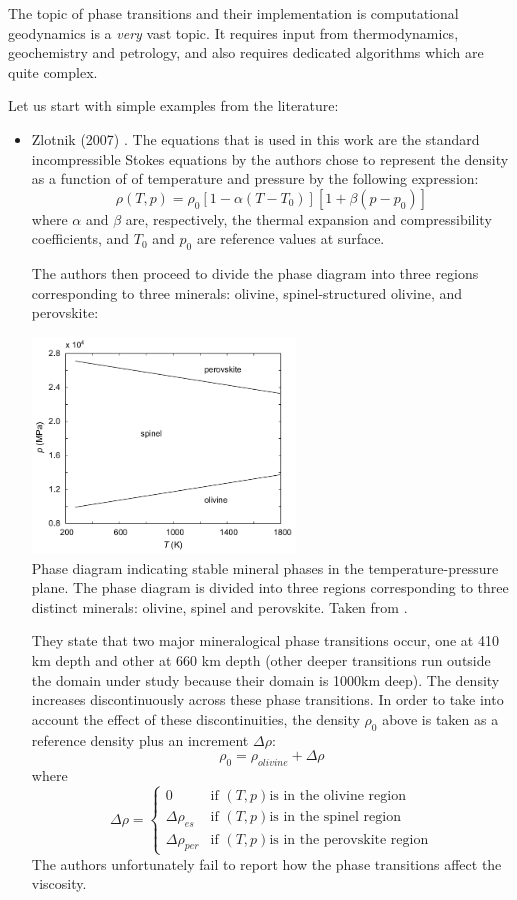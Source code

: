 
The topic of phase transitions and their implementation is computational geodynamics is a 
{\sl very} vast topic. It requires input from thermodynamics, geochemistry and petrology, and also requires 
dedicated algorithms which are quite complex.

Let us start with simple examples from the literature:

\begin{itemize}
\item Zlotnik \etal (2007) \cite{zldf07}. The equations that is used in this work are the 
standard incompressible Stokes equations by the authors chose to represent the 
density as a function of of temperature and pressure by the following expression:
\[
\rho(T,p)=\rho_0[1-\alpha(T-T_0)][1+\beta(p-p_0)]
\]
where $\alpha$ and $\beta$ are, respectively, the thermal expansion and
compressibility coefficients, and $T_0$ and $p_0$ are reference values at surface.

The authors then proceed to divide the phase diagram into three regions corresponding 
to three minerals: olivine, spinel-structured olivine, and perovskite:

\begin{center}
\includegraphics[width=7cm]{images/phasetransitions/zldf07}\\
{\captionfont Phase diagram indicating stable mineral phases in the 
temperature-pressure plane. The phase diagram is divided into three regions
corresponding to three distinct minerals: olivine, spinel and perovskite.
Taken from \cite{zldf07}.}
\end{center}

They state that two major mineralogical phase transitions occur, one at
410 km depth and other at 660 km depth (other deeper transitions run outside the 
domain under study because their domain is 1000km deep). The density increases 
discontinuously across these phase transitions. 
In order to take into account the effect of these 
discontinuities, the density $\rho_0$ above is taken as a reference density plus an 
increment $\Delta \rho$:
\[
\rho_0 = \rho_{olivine} + \Delta \rho
\]
where 
\[
\Delta \rho
=
\left\{
\begin{array}{lll}
0 & \text{if } (T,p) \text{is in the olivine region} \\
\Delta \rho_{es} & \text{if } (T,p) \text{is in the spinel region} \\
\Delta \rho_{per} & \text{if } (T,p) \text{is in the perovskite region} 
\end{array}
\right.
\]
The authors unfortunately fail to report how the phase transitions affect the viscosity.


\end{itemize}
